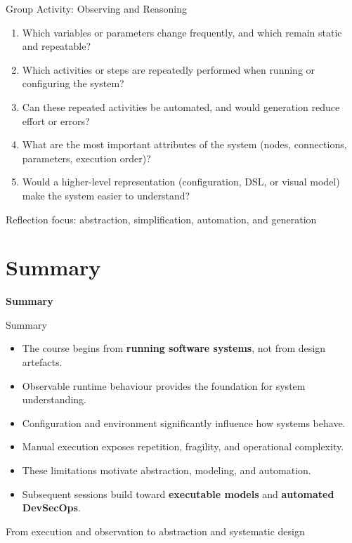 \documentclass[aspectratio=169, table]{beamer}
\begin{document}
\begin{frame}{Group Activity: Observing and Reasoning}
	\vspace{10pt}
	\begin{enumerate}
		\item Which variables or parameters change frequently, and which remain static and repeatable?
		\item Which activities or steps are repeatedly performed when running or configuring the system?
		\item Can these repeated activities be automated, and would generation reduce effort or errors?
		\item What are the most important attributes of the system (nodes, connections, parameters, execution order)?
		\item Would a higher-level representation (configuration, DSL, or visual model) make the system easier to understand?
	\end{enumerate}
	
	\vspace{6pt}
	{\footnotesize Reflection focus: abstraction, simplification, automation, and generation}
\end{frame}

\section{Summary}
	\begin{frame}{\hfill}
		\centering
		\Huge{\textbf{Summary}}
	\end{frame}

\begin{frame}{Summary}
	\vspace{10pt}
	\begin{itemize}
		\item The course begins from \textbf{running software systems}, not from design artefacts.
		\item Observable runtime behaviour provides the foundation for system understanding.
		\item Configuration and environment significantly influence how systems behave.
		\item Manual execution exposes repetition, fragility, and operational complexity.
		\item These limitations motivate abstraction, modeling, and automation.
		\item Subsequent sessions build toward \textbf{executable models} and \textbf{automated DevSecOps}.
	\end{itemize}
	
	\vspace{6pt}
	{\footnotesize From execution and observation to abstraction and systematic design}
\end{frame}
\end{document}

